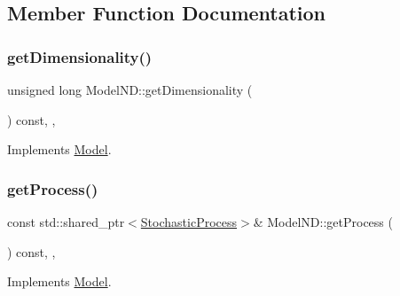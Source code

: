 \subsection{Member Function Documentation}
\hypertarget{class_model_n_d_ab2356536a38f4961257654de629d6093}{}\label{class_model_n_d_ab2356536a38f4961257654de629d6093} 
\subsubsection{\texorpdfstring{get\+Dimensionality()}{getDimensionality()}}
{\footnotesize\ttfamily unsigned long Model\+N\+D\+::get\+Dimensionality (\begin{DoxyParamCaption}{ }\end{DoxyParamCaption}) const\hspace{0.3cm}{\ttfamily [inline]}, {\ttfamily [override]}, {\ttfamily [virtual]}}



Implements \hyperlink{class_model_acbe41cf30367bce4b96e92812d644f2d}{Model}.

\hypertarget{class_model_n_d_a98976fe73a8895ff98ba60ea174232f8}{}\label{class_model_n_d_a98976fe73a8895ff98ba60ea174232f8} 
\subsubsection{\texorpdfstring{get\+Process()}{getProcess()}\hspace{0.1cm}{\footnotesize\ttfamily [1/2]}}
{\footnotesize\ttfamily const std\+::shared\+\_\+ptr$<$\hyperlink{class_stochastic_process}{Stochastic\+Process}$>$\& Model\+N\+D\+::get\+Process (\begin{DoxyParamCaption}{ }\end{DoxyParamCaption}) const\hspace{0.3cm}{\ttfamily [inline]}, {\ttfamily [override]}, {\ttfamily [virtual]}}



Implements \hyperlink{class_model_adc6a695d3f6b2def79f2dde69b3ab547}{Model}.

\hypertarget{class_model_n_d_a62866814432b7c0a0d8f58223cc6279d}{}\label{class_model_n_d_a62866814432b7c0a0d8f58223cc6279d} 
